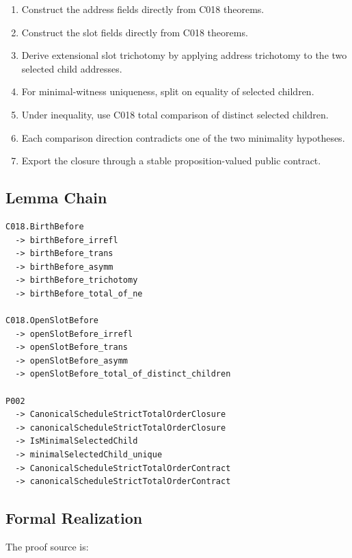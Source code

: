 \begin{enumerate}
\def\labelenumi{\arabic{enumi}.}
\tightlist
\item
  Construct the address fields directly from C018
  \texttt{\protect{}} theorems.
\item
  Construct the slot fields directly from C018
  \texttt{\protect{}} theorems.
\item
  Derive extensional slot trichotomy by applying address trichotomy to
  the two selected child addresses.
\item
  For minimal-witness uniqueness, split on equality of selected
  children.
\item
  Under inequality, use C018 total comparison of distinct selected
  children.
\item
  Each comparison direction contradicts one of the two minimality
  hypotheses.
\item
  Export the closure through a stable proposition-valued public
  contract.
\end{enumerate}

\subsection{Lemma Chain}\label{lemma-chain-1}

\begin{verbatim}
C018.BirthBefore
  -> birthBefore_irrefl
  -> birthBefore_trans
  -> birthBefore_asymm
  -> birthBefore_trichotomy
  -> birthBefore_total_of_ne

C018.OpenSlotBefore
  -> openSlotBefore_irrefl
  -> openSlotBefore_trans
  -> openSlotBefore_asymm
  -> openSlotBefore_total_of_distinct_children

P002
  -> CanonicalScheduleStrictTotalOrderClosure
  -> canonicalScheduleStrictTotalOrderClosure
  -> IsMinimalSelectedChild
  -> minimalSelectedChild_unique
  -> CanonicalScheduleStrictTotalOrderContract
  -> canonicalScheduleStrictTotalOrderContract
\end{verbatim}

\subsection{Formal Realization}\label{formal-realization-1}

The proof source is:

\texttt{\protect{}}

